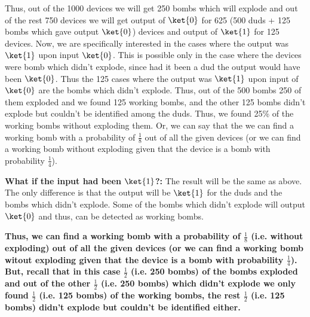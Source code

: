 \documentclass[12pt, oneside]{book}
\theoremstyle{definition}
\theoremstyle{definition}
\theoremstyle{remark}
\begin{document}
\begin{enumerate}
    Thus, out of the 1000 devices we will get 250 bombs which will explode and out of the rest 750 devices we will get output of $\ket{0}$ for 625 (500 duds + 125 bombs which gave output $\ket{0}$) devices and output of $\ket{1}$ for 125 devices. Now, we are specifically interested in the cases where the output was $\ket{1}$ upon input $\ket{0}$. This is possible
    only in the case where the devices were bomb which didn't explode, since had it been a dud the output would have been $\ket{0}$. Thus the 125 cases where the output was $\ket{1}$ upon input of $\ket{0}$ are the bombs which didn't explode. 
    Thus, out of the 500 bombs 250 of them exploded and we found 125 working bombs, and the other 125 bombs didn't explode but couldn't be identified among the duds. Thus, we found 25\% of the working bombs without exploding them. Or, we can say that the we can find a working bomb with a probability of $\frac{1}{8}$ out of all the given devices (or we can find a working bomb without exploding given that the device is a bomb with probability $\frac{1}{4}$).
    
    \textbf{What if the input had been $\ket{1}$?: }The result will be the same as above. The only difference is that the output will be $\ket{1}$ for the duds and the bombs which didn't explode. Some of the bombs which didn't explode will output $\ket{0}$ and thus, can be detected as working bombs.
    
    \textbf{Thus, we can find a working bomb with a probability of $\frac{1}{8}$ (i.e. without exploding) out of all the given devices (or we can find a working bomb witout exploding given that the device is a bomb with probability $\frac{1}{4}$). But, recall that in this case $\frac{1}{2}$ (i.e. 250 bombs) of the bombs exploded and out of the other $\frac{1}{2}$ (i.e. 250 bombs) which didn't explode we only found $\frac{1}{2}$ (i.e. 125 bombs) of the working bombs, the rest $\frac{1}{2}$ (i.e. 125 bombs) didn't explode but couldn't be identified either.}


\end{enumerate}
\end{document}
